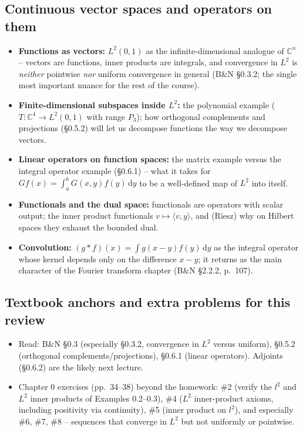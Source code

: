 \documentclass[11pt]{article}
\newcommand{\1}{\mathbf{1}}
\newcommand{\dd}{\,\mathrm{d}}
\theoremstyle{notestyle}
\theoremstyle{definition}
\begin{document}
\subsection*{Continuous vector spaces and operators on them}
\begin{itemize}
    \item \textbf{Functions as vectors:} $L^2(0,1)$ as the infinite-dimensional
    analogue of $\mathbb{C}^n$ -- vectors are functions, inner products are
    integrals, and convergence in $L^2$ is \emph{neither} pointwise \emph{nor}
    uniform convergence in general (B\&N \S0.3.2; the single most important nuance
    for the rest of the course).
    \item \textbf{Finite-dimensional subspaces inside $L^2$:} the polynomial
    example ($T : \mathbb{C}^4 \rightarrow L^2(0,1)$ with range $P_3$); how
    orthogonal complements and projections (\S0.5.2) will let us decompose
    functions the way we decompose vectors.
    \item \textbf{Linear operators on function spaces:} the matrix example versus
    the integral operator example (\S0.6.1) -- what it takes for
    $Gf(x) = \int_a^b G(x, y) f(y) \dd y$ to be a well-defined map of $L^2$ into
    itself.
    \item \textbf{Functionals and the dual space:} functionals are operators with
    scalar output; the inner product functionals $v \mapsto \langle v, y\rangle$,
    and (Riesz) why on Hilbert spaces they exhaust the bounded dual.
    \item \textbf{Convolution:} $(g * f)(x) = \int g(x - y) f(y) \dd y$ as the
    integral operator whose kernel depends only on the difference $x - y$; it
    returns as the main character of the Fourier transform chapter (B\&N
    \S2.2.2, p.\ 107).
\end{itemize}

\subsection*{Textbook anchors and extra problems for this review}
\begin{itemize}
    \item Read: B\&N \S0.3 (especially \S0.3.2, convergence in $L^2$ versus
    uniform), \S0.5.2 (orthogonal complements/projections), \S0.6.1 (linear
    operators). Adjoints (\S0.6.2) are the likely next lecture.
    \item Chapter 0 exercises (pp.\ 34--38) beyond the homework: \#2 (verify the
    $l^2$ and $L^2$ inner products of Examples 0.2--0.3), \#4 ($L^2$ inner-product
    axioms, including positivity via continuity), \#5 (inner product on $l^2$),
    and especially \#6, \#7, \#8 -- sequences that converge in $L^2$ but not
    uniformly or pointwise.
\end{itemize}
\end{document}

